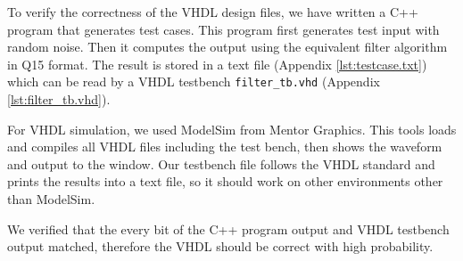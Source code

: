 To verify the correctness of the VHDL design files, we have written a C++ program that generates test cases. This program first generates test input with random noise. Then it computes the output using the equivalent filter algorithm in Q15 format. The result is stored in a text file (Appendix \ref{lst:testcase.txt}) which can be read by a VHDL testbench \texttt{filter\_tb.vhd} (Appendix \ref{lst:filter_tb.vhd}).

For VHDL simulation, we used ModelSim from Mentor Graphics. This tools loads and compiles all VHDL files including the test bench, then shows the waveform and output to the window. Our testbench file follows the VHDL standard and prints the results into a text file, so it should work on other environments other than ModelSim.

We verified that the every bit of the C++ program output and VHDL testbench output matched, therefore the VHDL should be correct with high probability.